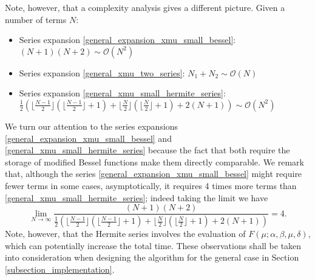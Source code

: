 \documentclass[10pt,a4paper,oneside]{article}
\numberwithin{equation}{section}
\begin{document}
Note, however, that a complexity analysis gives a different picture. Given a number of terms $N$:
\begin{itemize}
\item Series expansion \eqref{general_expansion_xmu_small_bessel}: $(N + 1) (N + 2) \sim \mathcal{O}(N^2)$
\item Series expansion \eqref{general_xmu_two_series}: $N_1 + N_2 \sim \mathcal{O}(N)$
\item Series expansion \eqref{general_xmu_small_hermite_series}: $\frac{1}{2}\left(\lfloor\frac{N - 1}{2} \rfloor \left(\lfloor\frac{N - 1}{2} \rfloor + 1\right) + \lfloor\frac{N}{2} \rfloor \left(\lfloor\frac{N}{2} \rfloor + 1\right) + 2 (N + 1)\right) \sim \mathcal{O}(N^2)$
\end{itemize}
We turn our attention to the series expansions \eqref{general_expansion_xmu_small_bessel} and \eqref{general_xmu_small_hermite_series} because the fact that both require the storage of modified Bessel functions make them directly comparable. We remark that, although the series \eqref{general_expansion_xmu_small_bessel} might require fewer terms in some cases, asymptotically, it requires 4 times more terms than \eqref{general_xmu_small_hermite_series}; indeed taking the limit we have
\begin{equation*}
\lim_{N\to\infty} \frac{(N + 1) (N + 2)}{\frac{1}{2}\left(\lfloor\frac{N - 1}{2} \rfloor \left(\lfloor\frac{N - 1}{2} \rfloor + 1\right) + \lfloor\frac{N}{2} \rfloor \left(\lfloor\frac{N}{2} \rfloor + 1\right) + 2 (N + 1)\right)} = 4.
\end{equation*}
Note, however, that the Hermite series involves the evaluation of $F(\mu; \alpha, \beta, \mu, \delta)$, which can potentially increase the total time. These observations shall be taken into consideration when designing the algorithm for the general case in Section \ref{subsection_implementation}.
\end{document}
